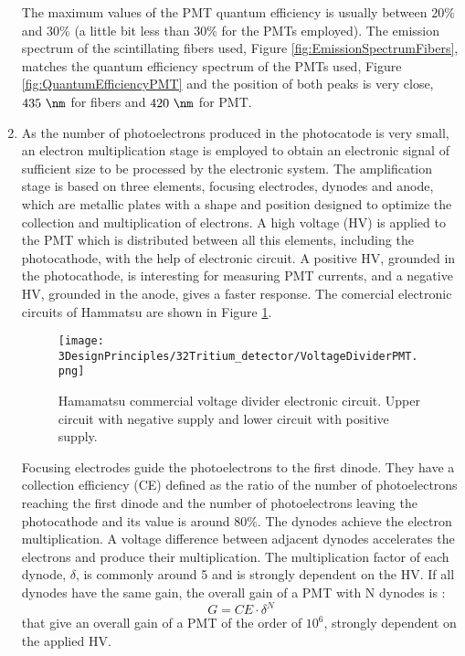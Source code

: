 \begin{enumerate}
The maximum values of the PMT quantum efficiency is usually between $20\%$ and $30\%$ \cite{Knoll} (a little bit less than $30\%$ for the PMTs employed). The emission spectrum of the scintillating fibers used, Figure \ref{fig:EmissionSpectrumFibers}, matches the quantum efficiency spectrum of the PMTs used, Figure \ref{fig:QuantumEfficiencyPMT} and the position of both peaks is very close, $435~\nm$ for fibers and $420~\nm$ for PMT.

\item{} As the number of photoelectrons produced in the photocatode is very small, an electron multiplication stage is employed to obtain an electronic signal of sufficient size to be processed by the electronic system. The amplification stage is based on three elements, focusing electrodes, dynodes and anode, which are metallic plates with a shape and position designed to optimize the collection and multiplication of electrons. A high voltage (HV) is applied to the PMT which is distributed between all this elements, including the photocathode, with the help of electronic circuit. A positive HV, grounded in the photocathode, is interesting for measuring PMT currents, and a negative HV, grounded in the anode, gives a faster response. The comercial electronic circuits of Hammatsu are shown in Figure \ref{fig:VoltageDividerCircuit}.

\begin{figure}[h]
\centering
\texttt{[image: 3DesignPrinciples/32Tritium\_detector/VoltageDividerPMT.png]}
\caption{Hamamatsu commercial voltage divider electronic circuit. Upper circuit with negative supply and lower circuit with positive supply.\label{fig:VoltageDividerCircuit}~\cite{DataSheetPMTs}}
\end{figure}


Focusing electrodes guide the photoelectrons to the first dinode. They have a collection efficiency (CE) defined as the ratio of the number of photoelectrons reaching the first dinode and the number of photoelectrons leaving the photocathode and its value is around $80\%$. The dynodes achieve the electron multiplication. A voltage difference between adjacent dynodes accelerates the electrons and produce their multiplication. The multiplication factor of each dynode, $\delta$, is commonly around 5 and is strongly dependent on the HV. If all dynodes have the same gain, the overall gain of a PMT with N dynodes is \cite{Knoll}:
\begin{equation}
G = CE\cdot{} \delta^N
\label{eq:PMTGain}
\end{equation}
that give an overall gain of a PMT of the order of $10^6$, strongly dependent on the applied HV.


\end{enumerate}
